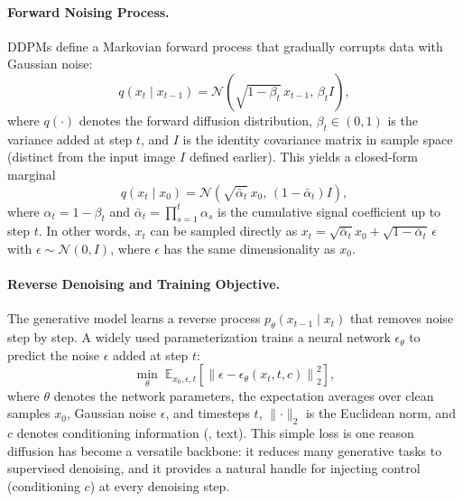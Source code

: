 \paragraph{Forward Noising Process.}
DDPMs define a Markovian forward process that gradually corrupts data with Gaussian noise:
\begin{equation}
q(x_t \mid x_{t-1}) = \mathcal{N}\!\left(\sqrt{1-\beta_t}\,x_{t-1},\,\beta_t I\right),
\end{equation}
where $q(\cdot)$ denotes the forward diffusion distribution, $\beta_t\in(0,1)$ is the variance added at step $t$, and $I$ is the identity covariance matrix in sample space (distinct from the input image $I$ defined earlier). This yields a closed-form marginal
\begin{equation}
q(x_t \mid x_0) = \mathcal{N}\!\left(\sqrt{\bar\alpha_t}\,x_0,\, (1-\bar\alpha_t)I\right),
\end{equation}
where $\alpha_t=1-\beta_t$ and $\bar\alpha_t=\prod_{s=1}^{t}\alpha_s$ is the cumulative signal coefficient up to step $t$. In other words, $x_t$ can be sampled directly as $x_t=\sqrt{\bar\alpha_t}x_0+\sqrt{1-\bar\alpha_t}\,\epsilon$ with $\epsilon\sim\mathcal{N}(0,I)$, where $\epsilon$ has the same dimensionality as $x_0$.

\paragraph{Reverse Denoising and Training Objective.}
The generative model learns a reverse process $p_\theta(x_{t-1}\mid x_t)$ that removes noise step by step. A widely used parameterization trains a neural network $\epsilon_\theta$ to predict the noise $\epsilon$ added at step $t$:
\begin{equation}
\min_{\theta}\;\mathbb{E}_{x_0,\epsilon,t}\left[\left\lVert \epsilon - \epsilon_\theta(x_t,t,c)\right\rVert_2^2\right],
\label{eq:diffusion_noise_prediction_objective}
\end{equation}
where $\theta$ denotes the network parameters, the expectation averages over clean samples $x_0$, Gaussian noise $\epsilon$, and timesteps $t$, $\lVert\cdot\rVert_2$ is the Euclidean norm, and $c$ denotes conditioning information (\eg, text). This simple loss is one reason diffusion has become a versatile backbone: it reduces many generative tasks to supervised denoising, and it provides a natural handle for injecting control (conditioning $c$) at every denoising step.

